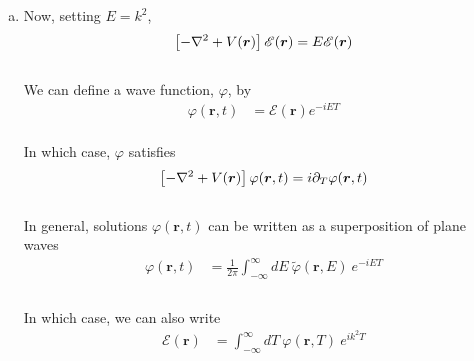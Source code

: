 \documentclass[]{article}
\begin{document}
\begin{enumerate}[1)]
\begin{enumerate}[a)]

\item Now, setting $E = k^2$, \\

\begin{equation}
\begin{aligned}
\left[ - \laplacian +   V(\bm{r})   \right] \mathscr{E}( \bm{r}) & = E \mathscr{E}( \bm{r}) \\ 
\end{aligned}
\end{equation} \\

We can define a wave function, $\varphi$, by \\

\begin{equation}
\begin{aligned}
\varphi ( \bm{r} , t ) & = \mathscr{E}( \bm{r}) e^{ - i E T}
\end{aligned}
\end{equation} \\

In which case, $\varphi$ satisfies \\

\begin{equation}
\begin{aligned}
\left[ - \laplacian +   V(\bm{r})   \right] \varphi ( \bm{r} , t ) & =  i \partial_T \varphi ( \bm{r} , t )  \\ 
\end{aligned}
\end{equation} \\

In general, solutions $\varphi ( \bm{r} , t )$ can be written as a superposition of plane waves \\


\begin{equation}
\begin{aligned}
\varphi ( \bm{r} , t )  & = \frac{1}{2\pi} \int_{-\infty}^{\infty} dE \: \tilde{\varphi} ( \bm{r} , E ) \: e^{ - i E T } \\ 
\end{aligned}
\end{equation} \\

In which case, we can also write \\


\begin{equation}
\begin{aligned}
\mathscr{E} ( \bm{r} )  & = \int_{-\infty}^{\infty} dT \: \varphi ( \bm{r} , T) \: e^{  i k^2 T } \\ 
\end{aligned}
\end{equation} \\


\end{enumerate}
\end{enumerate}
\end{document}
